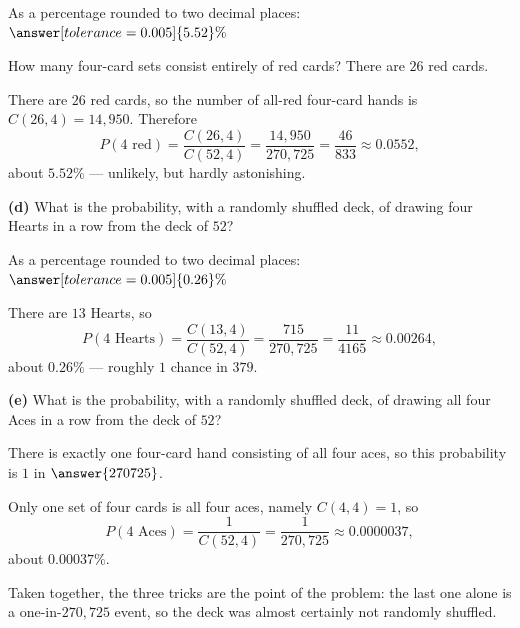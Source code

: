 \documentclass[12pt]{ximera}
\begin{document}
\begin{problem}
\begin{prompt}
As a percentage rounded to two decimal places: $\answer[tolerance=0.005]{5.52}\%$

\begin{hint}
How many four-card sets consist entirely of red cards? There are $26$ red cards.
\end{hint}

\begin{feedback}
There are $26$ red cards, so the number of all-red four-card hands is
$C(26,4)=14{,}950$. Therefore
\[
P(\text{4 red}) = \frac{C(26,4)}{C(52,4)}=\frac{14{,}950}{270{,}725}=\frac{46}{833}\approx 0.0552,
\]
about $5.52\%$ --- unlikely, but hardly astonishing.
\end{feedback}
\end{prompt}

\begin{prompt}
\textbf{(d)} What is the probability, with a randomly shuffled deck, of drawing four
Hearts in a row from the deck of $52$?

As a percentage rounded to two decimal places: $\answer[tolerance=0.005]{0.26}\%$

\begin{feedback}
There are $13$ Hearts, so
\[
P(\text{4 Hearts}) = \frac{C(13,4)}{C(52,4)}=\frac{715}{270{,}725}=\frac{11}{4165}\approx 0.00264,
\]
about $0.26\%$ --- roughly $1$ chance in $379$.
\end{feedback}
\end{prompt}

\begin{prompt}
\textbf{(e)} What is the probability, with a randomly shuffled deck, of drawing all
four Aces in a row from the deck of $52$?

There is exactly one four-card hand consisting of all four aces, so this probability
is $1$ in $\answer{270725}$.

\begin{feedback}
Only one set of four cards is all four aces, namely $C(4,4)=1$, so
\[
P(\text{4 Aces}) = \frac{1}{C(52,4)}=\frac{1}{270{,}725}\approx 0.0000037,
\]
about $0.00037\%$.

Taken together, the three tricks are the point of the problem: the last one alone is
a one-in-$270{,}725$ event, so the deck was almost certainly not randomly shuffled.
\end{feedback}
\end{prompt}
\end{problem}
\end{document}
